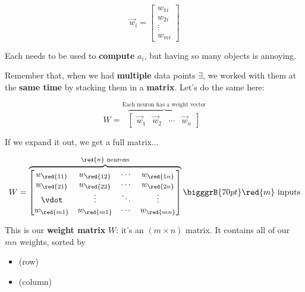         \begin{equation}
            \vec{w}_i = 
            \begin{bmatrix}
              w_{1i}\\w_{2i}\\ \vdots \\ w_{mi}
            \end{bmatrix}
        \end{equation}
            
        Each needs to be used to \textbf{compute} $a_i$, but having so many objects is annoying.
        
        Remember that, when we had \textbf{multiple} data points $\exi$, we worked with them at the \textbf{same time} by stacking them in a \textbf{matrix}. Let's do the same here:
        
        \begin{equation}
            W = 
            \overbrace{
                \begin{bmatrix}
                  \vec{w}_1 & \vec{w}_2 & \cdots & \vec{w}_n
                \end{bmatrix}
            }^{\text{Each neuron has a weight vector}}
        \end{equation}
        
        If we expand it out, we get a full matrix...
        
        \begin{equation}
            W = 
            \overbrace{
                \begin{bmatrix}
                  w_{\red{11}} & w_{\red{12}} & \cdots & w_{\red{1n}} \\
                  w_{\red{21}} & w_{\red{22}} & \cdots & w_{\red{2n}} \\
                  \vdot        & \vdots       & \ddots & \vdots \\
                  w_{\red{m1}} & w_{\red{m1}} & \cdots & w_{\red{mn}} \\
                \end{bmatrix}
            }^{\red{n} \text{ neurons}}
            \bigggrB{70pt} \red{m} \text{ inputs}
        \end{equation}
        
        This is our \textbf{weight matrix} $W$: it's an $(m \times n)$ matrix. It contains all of our $mn$ weights, sorted by
        
        \begin{itemize}
            \item {} (row)
            \item {} (column)
        \end{itemize} 
        
